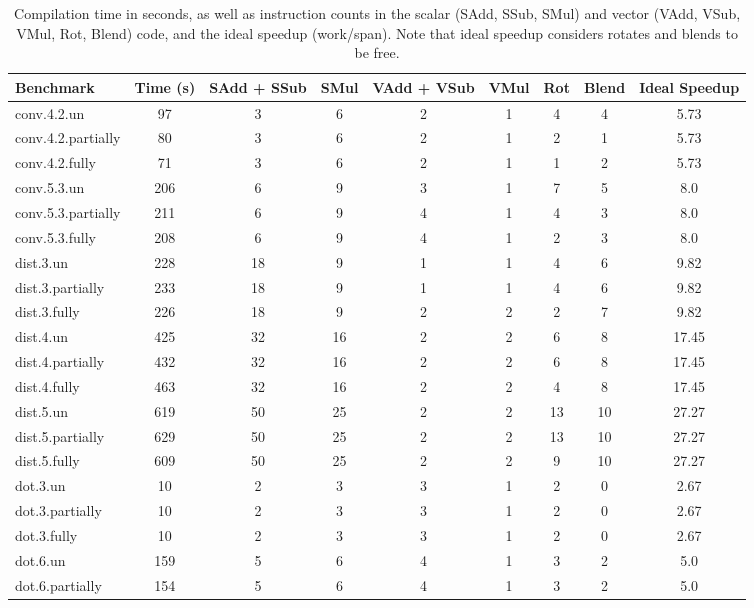 \begin{table}
	\centering
    \caption{Compilation time in seconds, as well as instruction counts in the scalar (SAdd, SSub, SMul) and vector (VAdd, VSub, VMul, Rot, Blend) code, and the ideal speedup (work/span). Note that ideal speedup considers rotates and blends to be free.}\label{tab:big-ass}
    \vspace{-0.5em}
    \begin{tabular}{lcccccccc}
    \toprule
    Benchmark & Time (s) & SAdd + SSub & SMul & VAdd + VSub & VMul & Rot & Blend & Ideal Speedup\\\midrule
    conv.4.2.un & 97 & 3 & 6 & 2 & 1 & 4 & 4 & 5.73\\
    conv.4.2.partially & 80 & 3 & 6 & 2 & 1 & 2 & 1 & 5.73\\
    conv.4.2.fully & 71 & 3 & 6 & 2 & 1 & 1 & 2 & 5.73\\
    \midrule
    conv.5.3.un & 206 & 6 & 9 & 3 & 1 & 7 & 5 & 8.0\\
    conv.5.3.partially & 211 & 6 & 9 & 4 & 1 & 4 & 3 & 8.0\\
    conv.5.3.fully & 208 & 6 & 9 & 4 & 1 & 2 & 3 & 8.0\\
    \midrule
    dist.3.un & 228 & 18 & 9 & 1 & 1 & 4 & 6 & 9.82\\
    dist.3.partially & 233 & 18 & 9 & 1 & 1 & 4 & 6 & 9.82\\
    dist.3.fully & 226 & 18 & 9 & 2 & 2 & 2 & 7 & 9.82\\
    \midrule
    dist.4.un & 425 & 32 & 16 & 2 & 2 & 6 & 8 & 17.45\\
    dist.4.partially & 432 & 32 & 16 & 2 & 2 & 6 & 8 & 17.45\\
    dist.4.fully & 463 & 32 & 16 & 2 & 2 & 4 & 8 & 17.45\\
    \midrule
    dist.5.un & 619 & 50 & 25 & 2 & 2 & 13 & 10 & 27.27\\
    dist.5.partially & 629 & 50 & 25 & 2 & 2 & 13 & 10 & 27.27\\
    dist.5.fully & 609 & 50 & 25 & 2 & 2 & 9 & 10 & 27.27\\
    \midrule
    dot.3.un & 10 & 2 & 3 & 3 & 1 & 2 & 0 & 2.67\\
    dot.3.partially & 10 & 2 & 3 & 3 & 1 & 2 & 0 & 2.67\\
    dot.3.fully & 10 & 2 & 3 & 3 & 1 & 2 & 0 & 2.67\\
    \midrule
    dot.6.un & 159 & 5 & 6 & 4 & 1 & 3 & 2 & 5.0\\
    dot.6.partially & 154 & 5 & 6 & 4 & 1 & 3 & 2 & 5.0\\

\end{tabular}
\end{table}
